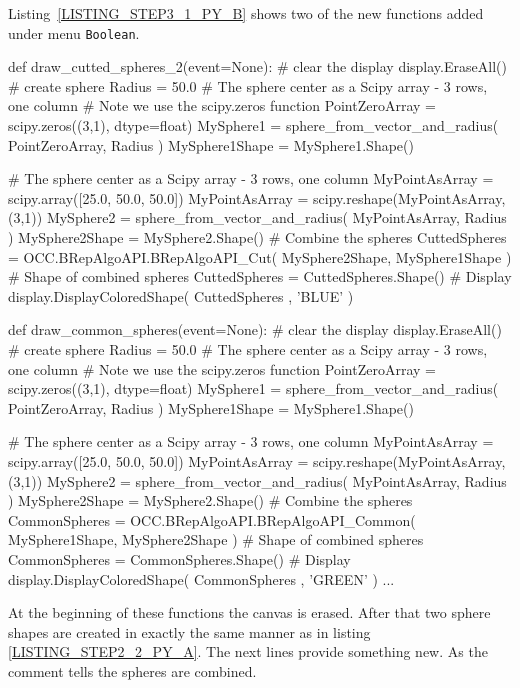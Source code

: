 Listing~\ref{LISTING_STEP3_1_PY_B} shows two of the new functions added under menu {\tt Boolean}.
%
\begin{python}[moreemph={[4], 46, 48},caption={Step3\_1.py - Extending the functionality},label=LISTING_STEP3_1_PY_B]
def draw_cutted_spheres_2(event=None):
    # clear the display
    display.EraseAll()
    # create sphere
    Radius = 50.0
    # The sphere center as a Scipy array - 3 rows, one column
    # Note we use the scipy.zeros function
    PointZeroArray = scipy.zeros((3,1), dtype=float)
    MySphere1 = sphere_from_vector_and_radius(  PointZeroArray, 
                                                Radius )
    MySphere1Shape = MySphere1.Shape()

    # The sphere center as a Scipy array - 3 rows, one column
    MyPointAsArray = scipy.array([25.0, 50.0, 50.0])
    MyPointAsArray = scipy.reshape(MyPointAsArray,(3,1))
    MySphere2 = sphere_from_vector_and_radius(  MyPointAsArray, 
                                                Radius )
    MySphere2Shape = MySphere2.Shape()
    # Combine the spheres
    CuttedSpheres = OCC.BRepAlgoAPI.BRepAlgoAPI_Cut(    MySphere2Shape, 
                                                        MySphere1Shape )
    # Shape of combined spheres
    CuttedSpheres = CuttedSpheres.Shape()
    # Display 
    display.DisplayColoredShape( CuttedSpheres , 'BLUE' ) 

def draw_common_spheres(event=None):
    # clear the display
    display.EraseAll()
    # create sphere
    Radius = 50.0
    # The sphere center as a Scipy array - 3 rows, one column
    # Note we use the scipy.zeros function
    PointZeroArray = scipy.zeros((3,1), dtype=float)
    MySphere1 = sphere_from_vector_and_radius(  PointZeroArray, 
                                                Radius )
    MySphere1Shape = MySphere1.Shape()

    # The sphere center as a Scipy array - 3 rows, one column
    MyPointAsArray = scipy.array([25.0, 50.0, 50.0])
    MyPointAsArray = scipy.reshape(MyPointAsArray,(3,1))
    MySphere2 = sphere_from_vector_and_radius(  MyPointAsArray, 
                                                Radius )
    MySphere2Shape = MySphere2.Shape()
    # Combine the spheres
    CommonSpheres = OCC.BRepAlgoAPI.BRepAlgoAPI_Common( MySphere1Shape, 
                                                        MySphere2Shape )
    # Shape of combined spheres
    CommonSpheres = CommonSpheres.Shape()
    # Display 
    display.DisplayColoredShape( CommonSpheres , 'GREEN' ) 
...    
\end{python}
At the beginning of these functions the canvas is erased.
After that two sphere shapes are created in exactly the same manner as in listing \ref{LISTING_STEP2_2_PY_A}.
The next lines provide something new.
As the comment tells the spheres are combined.

